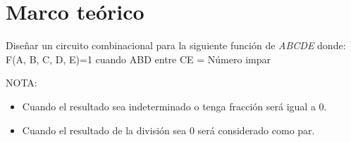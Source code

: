 \documentclass[12pt, oneside, openany]{article}
\begin{document}
\section{Marco teórico}
{\sffamily\Large
    \hspace{0.5cm} Diseñar un circuito combinacional para la siguiente función de \emph{ABCDE} donde:
    F(A, B, C, D, E)=1 cuando ABD entre CE = Número impar
    
    \hspace{0.5cm} NOTA:
    \begin{itemize}
        \item Cuando el resultado sea indeterminado o tenga fracción será igual a 0.
        \newpage
        \item Cuando el resultado de la división sea 0 será considerado como par.
    \end{itemize}
    
}
\end{document}
